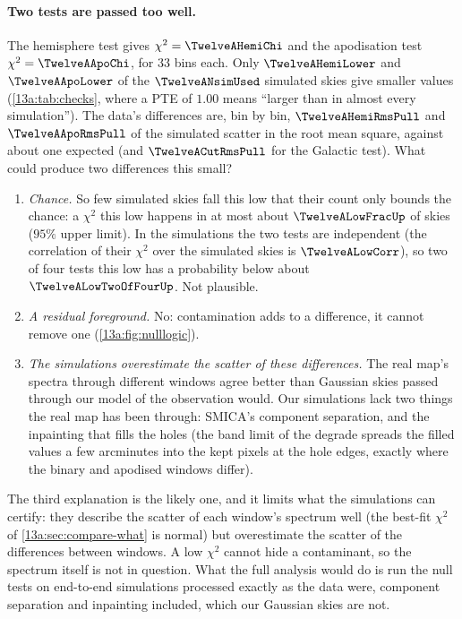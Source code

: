 \paragraph{Two tests are passed too well.} The hemisphere test gives $\chi^2=\TwelveAHemiChi$ and the apodisation test
$\chi^2=\TwelveAApoChi$, for $33$ bins each. Only $\TwelveAHemiLower$ and $\TwelveAApoLower$ of the $\TwelveANsimUsed$ simulated skies
give smaller values (\cref{13a:tab:checks}, where a PTE of $1.00$ means ``larger than in almost every simulation''). The data's
differences are, bin by bin, $\TwelveAHemiRmsPull$ and $\TwelveAApoRmsPull$ of the simulated scatter in the root mean square,
against about one expected (and $\TwelveACutRmsPull$ for the Galactic test). What could produce two differences this small?
\begin{enumerate}[itemsep=2pt,leftmargin=1.5em]
  \item \emph{Chance.} So few simulated skies fall this low that their count only bounds the chance: a $\chi^2$
        this low happens in at most about $\TwelveALowFracUp$ of skies ($95\%$ upper limit). In the simulations the two
        tests are independent (the correlation of their $\chi^2$ over the simulated skies is $\TwelveALowCorr$), so two of
        four tests this low has a probability below about $\TwelveALowTwoOfFourUp$. Not plausible.
  \item \emph{A residual foreground.} No: contamination adds to a difference, it cannot remove one (\cref{13a:fig:nulllogic}).
  \item \emph{The simulations overestimate the scatter of these differences.} The real map's spectra through different
        windows agree better than Gaussian skies passed through our model of the observation would. Our simulations
        lack two things the real map has been through: SMICA's component separation, and the inpainting that fills the
        holes (the band limit of the degrade spreads the filled values a few arcminutes into the kept pixels at the hole
        edges, exactly where the binary and apodised windows differ).
\end{enumerate}
The third explanation is the likely one, and it limits what the simulations can certify: they describe the scatter of
each window's spectrum well (the best-fit $\chi^2$ of \cref{13a:sec:compare-what} is normal) but overestimate the
scatter of the differences between windows. A low $\chi^2$ cannot hide a contaminant, so the spectrum itself is not
in question. What the full analysis would do is run the null tests on end-to-end simulations processed exactly as the data
were, component separation and inpainting included, which our Gaussian skies are not.

